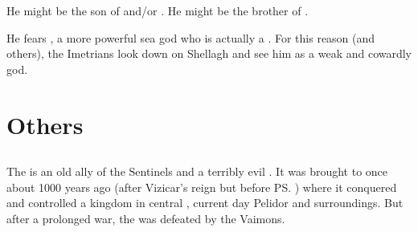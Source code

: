 He might be the son of  and/or .
He might be the brother of . 

He fears , a more powerful sea god who is actually a \nagalord. 
For this reason (and others), the Imetrians look down on Shellagh and see him as a weak and cowardly god. 





























\chapter{Others}















\section{\Haskelek}
The \Haskelek{} is an old ally of the Sentinels and a terribly evil \daemon. 
It was brought to \Miith{} once about 1000 years ago (after Vizicar's reign but before \ps{\Belzir}) where it conquered and controlled a kingdom in central \Velcad{}, current day Pelidor and surroundings. 
But after a prolonged war, the \Haskelek{} was defeated by the Vaimons. 


